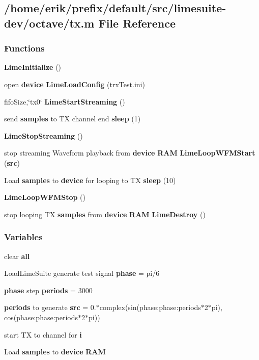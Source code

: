 \subsection{/home/erik/prefix/default/src/limesuite-\/dev/octave/tx.m File Reference}
\label{tx_8m}
\subsubsection*{Functions}
\begin{DoxyCompactItemize}
\item 
{\bf Lime\+Initialize} ()
\item 
open {\bf device} {\bf Lime\+Load\+Config} (\textquotesingle{}trx\+Test.\+ini\textquotesingle{})
\item 
fifo\+Size,\char`\"{}tx0\char`\"{} {\bf Lime\+Start\+Streaming} ()
\item 
send {\bf samples} to TX channel end {\bf sleep} (1)
\item 
{\bf Lime\+Stop\+Streaming} ()
\item 
stop streaming Waveform playback from {\bf device} {\bf R\+AM} {\bf Lime\+Loop\+W\+F\+M\+Start} ({\bf src})
\item 
Load {\bf samples} to {\bf device} for looping to TX {\bf sleep} (10)
\item 
{\bf Lime\+Loop\+W\+F\+M\+Stop} ()
\item 
stop looping TX {\bf samples} from {\bf device} {\bf R\+AM} {\bf Lime\+Destroy} ()
\end{DoxyCompactItemize}
\subsubsection*{Variables}
\begin{DoxyCompactItemize}
\item 
clear {\bf all}
\item 
Load\+Lime\+Suite generate test signal {\bf phase} = pi/6
\item 
{\bf phase} step {\bf periods} = 3000
\item 
{\bf periods} to generate {\bf src} = 0.$\ast$complex(sin(phase\+:phase\+:periods$\ast$2$\ast$pi), cos(phase\+:phase\+:periods$\ast$2$\ast$pi))
\item 
start TX to channel for {\bf i}
\item 
Load {\bf samples} to {\bf device} {\bf R\+AM}
\end{DoxyCompactItemize}


